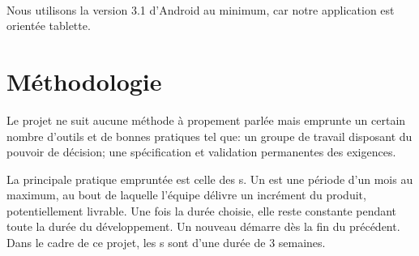 \paragraph{}Nous utilisons la version 3.1 d'Android au minimum, car notre application est orientée tablette.
\section{Méthodologie}
Le projet ne suit aucune méthode \agile{} à propement parlée mais emprunte un certain nombre d'outils et de \og{}bonnes pratiques\fg{} tel que: un \og{}groupe de travail disposant du pouvoir de décision\fg{}; une \og{}spécification et validation permanentes des exigences\fg{}.

La principale pratique empruntée est celle des \sprint s. Un \sprint{} est une période d'un mois au maximum, au bout de laquelle l'équipe délivre un incrément du produit, potentiellement livrable. Une fois la durée choisie, elle reste constante pendant toute la durée du développement. Un nouveau \sprint{} démarre dès la fin du précédent. Dans le cadre de ce projet, les \sprint s sont d'une durée de 3 semaines.
